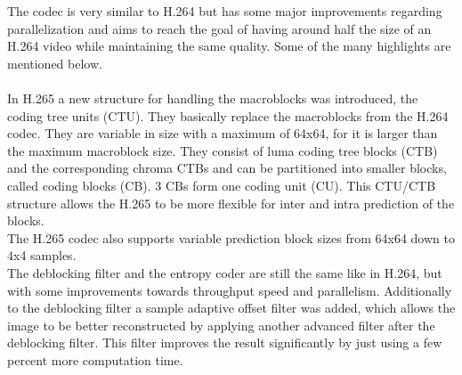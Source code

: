 The codec is very similar to H.264 but has some major improvements regarding parallelization and aims to reach the goal of having around half the size of an H.264 video while maintaining the same quality. Some of the many highlights are mentioned below.\\
\\
In H.265 a new structure for handling the macroblocks was introduced, the coding tree units (CTU). They basically replace the macroblocks from the H.264 codec. They are variable in size with a maximum of 64x64, for it is larger than the maximum macroblock size. They consist of luma coding tree blocks (CTB) and the corresponding chroma CTBs and can be partitioned into smaller blocks, called coding blocks (CB). 3 CBs form one coding unit (CU). This CTU/CTB structure allows the H.265 to be more flexible for inter and intra prediction of the blocks.\\
The H.265 codec also supports variable prediction block sizes from 64x64 down to 4x4 samples.\\
The deblocking filter and the entropy coder are still the same like in H.264, but with some improvements towards throughput speed and parallelism. Additionally to the deblocking filter a sample adaptive offset filter was added, which allows the image to be better reconstructed by applying another advanced filter after the deblocking filter. This filter improves the result significantly by just using a few percent more computation time.
